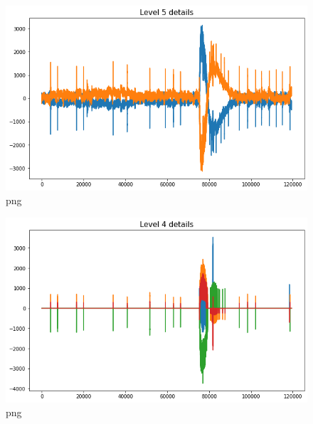 \begin{figure}
\centering
\includegraphics{denoising_files/denoising_7_0.png}
\caption{png}
\end{figure}

\begin{figure}
\centering
\includegraphics{denoising_files/denoising_7_1.png}
\caption{png}
\end{figure}
